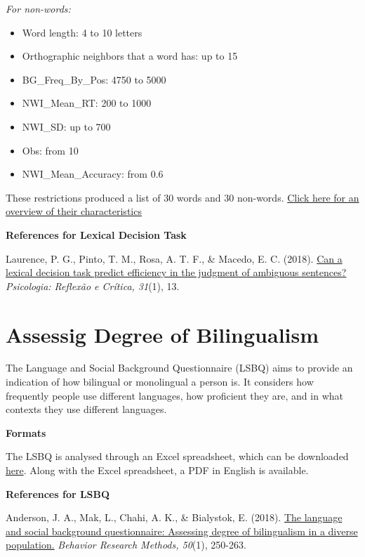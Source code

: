 \documentclass[
]{book}
\providecommand{\tightlist}{%
  \setlength{\itemsep}{0pt}\setlength{\parskip}{0pt}}
\begin{document}
\emph{For non-words:}

\begin{itemize}
\tightlist
\item
  Word length: 4 to 10 letters
\item
  Orthographic neighbors that a word has: up to 15
\item
  BG\_Freq\_By\_Pos: 4750 to 5000
\item
  NWI\_Mean\_RT: 200 to 1000
\item
  NWI\_SD: up to 700
\item
  Obs: from 10
\item
  NWI\_Mean\_Accuracy: from 0.6
\end{itemize}

These restrictions produced a list of 30 words and 30 non-words. \href{extras/Lexical\%20Decision\%20Task\%20Words.xlsx}{Click here for an overview of their characteristics}

\textbf{References for Lexical Decision Task}

Laurence, P. G., Pinto, T. M., Rosa, A. T. F., \& Macedo, E. C. (2018). \href{https://prc.springeropen.com/articles/10.1186/s41155-018-0093-0}{Can a lexical decision task predict efficiency in the judgment of ambiguous sentences?} \emph{Psicologia: Reflexão e Crítica, 31}(1), 13.

\hypertarget{assessig-degree-of-bilingualism}{%
\section{Assessig Degree of Bilingualism}\label{assessig-degree-of-bilingualism}}

The Language and Social Background Questionnaire (LSBQ) aims to provide an indication of how bilingual or monolingual a person is. It considers how frequently people use different languages, how proficient they are, and in what contexts they use different languages.

\textbf{Formats}

The LSBQ is analysed through an Excel spreadsheet, which can be downloaded \href{https://figshare.com/articles/The_Language_and_Social_Background_Questionnaire_Assessing_Degree_of_Bilingualism_in_a_Diverse_Population_Supplementary_Materials/3972486}{here}. Along with the Excel spreadsheet, a PDF in English is available.

\textbf{References for LSBQ}

Anderson, J. A., Mak, L., Chahi, A. K., \& Bialystok, E. (2018). \href{https://link.springer.com/article/10.3758/s13428-017-0867-9}{The language and social background questionnaire: Assessing degree of bilingualism in a diverse population.} \emph{Behavior Research Methods, 50}(1), 250-263.
\end{document}
